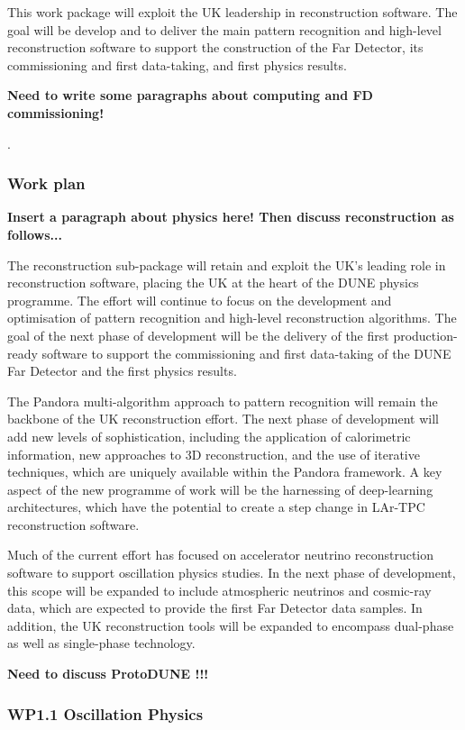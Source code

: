 This work package will exploit the UK leadership in reconstruction software. The goal will be
develop and to deliver the main pattern recognition and high-level reconstruction software
to support the construction of the Far Detector, its commissioning and first data-taking,
and first physics results.

{\bf Need to write some paragraphs about computing and FD commissioning!}


.

\subsubsection{Work plan}

{\bf Insert a paragraph about physics here! Then discuss reconstruction as follows...}

The reconstruction sub-package will retain and exploit the UK's leading role in reconstruction software,
placing the UK at the heart of the DUNE physics programme. The effort will continue to focus on the
development and optimisation of pattern recognition and high-level reconstruction algorithms.
The goal of the next phase of development will be the delivery of the first production-ready software
to support the commissioning and first data-taking of the DUNE Far Detector and the first physics results.

The Pandora multi-algorithm approach to pattern recognition will remain the backbone of the
UK reconstruction effort. The next phase of development will add new levels of sophistication,
including the application of calorimetric information, new approaches to 3D reconstruction,
and the use of iterative techniques, which are uniquely available within the Pandora framework.
A key aspect of the new programme of work will be the harnessing of deep-learning architectures,
which have the potential to create a step change in LAr-TPC reconstruction software.

Much of the current effort has focused on accelerator neutrino reconstruction software to support
oscillation physics studies. In the next phase of development, this scope will be expanded to
include atmospheric neutrinos and cosmic-ray data, which  are expected to provide the first
Far Detector data samples. In addition, the UK reconstruction tools will be expanded to encompass
dual-phase as well as single-phase technology.

{ \bf Need to discuss ProtoDUNE !!!}

\subsubsection{WP1.1 Oscillation Physics}

